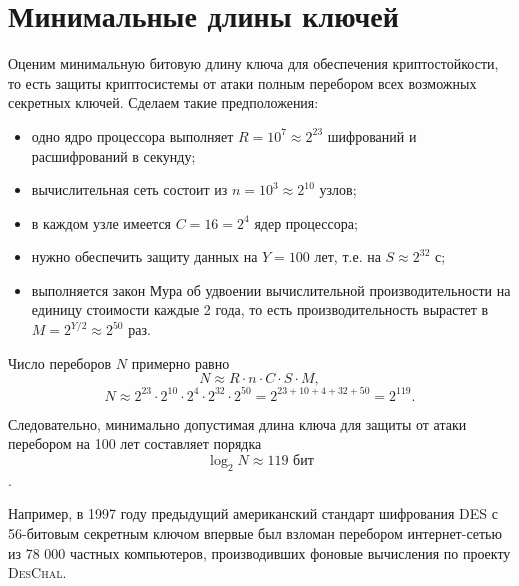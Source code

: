 \section{Минимальные длины ключей}

Оценим минимальную битовую длину ключа для обеспечения криптостойкости, то есть защиты криптосистемы от атаки полным перебором всех возможных секретных ключей. Сделаем такие предположения:

\begin{itemize}
    \item одно ядро процессора выполняет $R = 10^7 \approx 2^{23}$ шифрований и расшифрований в секунду;
    \item вычислительная сеть состоит из $n = 10^3 \approx 2^{10}$ узлов;
    \item в каждом узле имеется $C = 16 = 2^4$ ядер процессора;
    \item нужно обеспечить защиту данных на $Y = 100$ лет, т.е. на $S \approx 2^{32}$ с;
    \item выполняется закон Мура об удвоении вычислительной производительности на единицу стоимости каждые 2 года, то есть производительность вырастет в $M = 2^{Y/2} \approx 2^{50}$ раз.
\end{itemize}

Число переборов $N$ примерно равно
    \[ N \approx R \cdot n \cdot C \cdot S \cdot M, \]
    \[ N \approx 2^{23} \cdot 2^{10} \cdot 2^{4} \cdot 2^{32} \cdot 2^{50} = 2^{23+10+4+32+50} = 2^{119}. \]

Следовательно, минимально допустимая длина ключа для защиты от атаки перебором на 100 лет составляет порядка
    \[ \log_2 N \approx 119\text{ бит} \] .

Например, в 1997 году предыдущий американский стандарт шифрования DES с 56-битовым секретным ключом впервые был взломан перебором интернет-сетью из 78 000 частных компьютеров, производивших фоновые вычисления по проекту \textsc{DesChal}.
